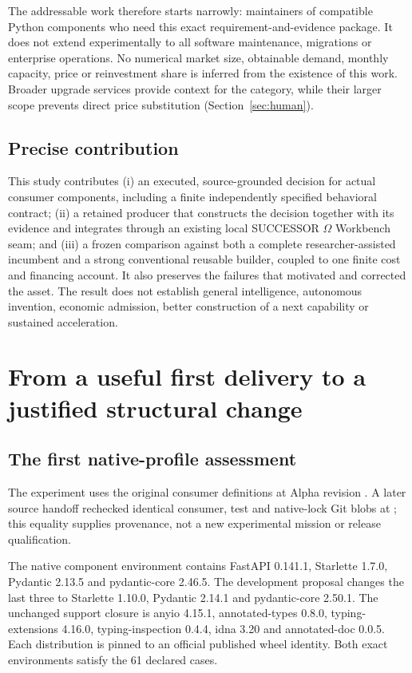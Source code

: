 \documentclass[11pt,a4paper]{article}
\newcommand{\Successor}{SUCCESSOR $\Omega$}
\begin{document}
The addressable work therefore starts narrowly: maintainers of compatible Python components who need this exact requirement-and-evidence package. It does not extend experimentally to all software maintenance, migrations or enterprise operations. No numerical market size, obtainable demand, monthly capacity, price or reinvestment share is inferred from the existence of this work. Broader upgrade services provide context for the category, while their larger scope prevents direct price substitution (Section~\ref{sec:human}).

\subsection{Precise contribution}

This study contributes (i) an executed, source-grounded decision for actual consumer components, including a finite independently specified behavioral contract; (ii) a retained producer that constructs the decision together with its evidence and integrates through an existing local \Successor{} Workbench seam; and (iii) a frozen comparison against both a complete researcher-assisted incumbent and a strong conventional reusable builder, coupled to one finite cost and financing account. It also preserves the failures that motivated and corrected the asset. The result does not establish general intelligence, autonomous invention, economic admission, better construction of a next capability or sustained acceleration.

\section{From a useful first delivery to a justified structural change}
\label{sec:first}

\subsection{The first native-profile assessment}

The experiment uses the original consumer definitions at Alpha revision . A later source handoff rechecked identical consumer, test and native-lock Git blobs at ; this equality supplies provenance, not a new experimental mission or release qualification.\cite{consumer,companion}

The native component environment contains FastAPI 0.141.1, Starlette 1.7.0, Pydantic 2.13.5 and pydantic-core 2.46.5. The development proposal changes the last three to Starlette 1.10.0, Pydantic 2.14.1 and pydantic-core 2.50.1. The unchanged support closure is anyio 4.15.1, annotated-types 0.8.0, typing-extensions 4.16.0, typing-inspection 0.4.4, idna 3.20 and annotated-doc 0.0.5. Each distribution is pinned to an official published wheel identity. Both exact environments satisfy the 61 declared cases.\cite{firstdelivery,selection}
\end{document}
